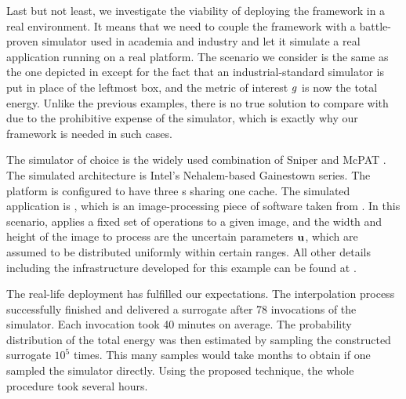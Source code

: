 Last but not least, we investigate the viability of deploying the framework in a
real environment. It means that we need to couple the framework with a
battle-proven simulator used in academia and industry and let it simulate a real
application running on a real platform. The scenario we consider is the same as
the one depicted in  except for the fact that an
industrial-standard simulator is put in place of the leftmost box, and the
metric of interest $g$ is now the total energy. Unlike the previous examples,
there is no true solution to compare with due to the prohibitive expense of the
simulator, which is exactly why our framework is needed in such cases.

The simulator of choice is the widely used combination of Sniper
\cite{carlson2011} and McPAT \cite{li2009}. The simulated architecture is
Intel's Nehalem-based Gainestown series. The platform is configured to have
three s sharing one  cache. The simulated application is
, which is an image-processing piece of software taken from 
\cite{bienia2011}. In this scenario,  applies a fixed set of operations
to a given image, and the width and height of the image to process are the
uncertain parameters $\mathbf{u}$, which are assumed to be distributed uniformly within
certain ranges. All other details including the infrastructure developed for
this example can be found at \cite{sources}.

The real-life deployment has fulfilled our expectations. The interpolation
process successfully finished and delivered a surrogate after 78 invocations of
the simulator. Each invocation took 40 minutes on average. The probability
distribution of the total energy was then estimated by sampling the constructed
surrogate $10^5$ times. This many samples would take months to obtain if one
sampled the simulator directly. Using the proposed technique, the whole
procedure took several hours.
